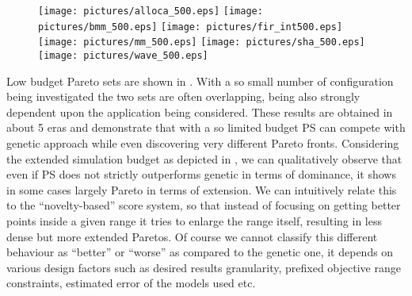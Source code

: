 \begin{figure}
  \begin{center}
    \texttt{[image: pictures/alloca\_500.eps]}
    \texttt{[image: pictures/bmm\_500.eps]}
    \texttt{[image: pictures/fir\_int500.eps]}
    \texttt{[image: pictures/mm\_500.eps]}
    \texttt{[image: pictures/sha\_500.eps]}
    \texttt{[image: pictures/wave\_500.eps]} 
  \end{center}
\end{figure}
Low budget Pareto sets are shown in . With a so small number of
configuration being investigated the two sets are often overlapping,
being also strongly dependent upon the application being considered.
These results are obtained in about 5 eras and demonstrate that with a so limited budget PS can compete with
genetic approach while even discovering very different Pareto fronts. 
Considering the extended simulation budget as depicted in
, we can qualitatively observe that
even if PS does not strictly outperforms genetic in terms of dominance, it shows in
some cases largely Pareto in terms of extension. We can intuitively
relate this to the ``novelty-based'' score system, so that instead of
focusing on getting better points inside a given range it tries to
enlarge the range itself, resulting in less dense but more extended
Paretos. Of course we cannot classify this different behaviour as
``better'' or ``worse'' as compared to the genetic one, it depends on
various design factors such as desired results granularity, prefixed objective
range constraints, estimated error of the models used etc.


